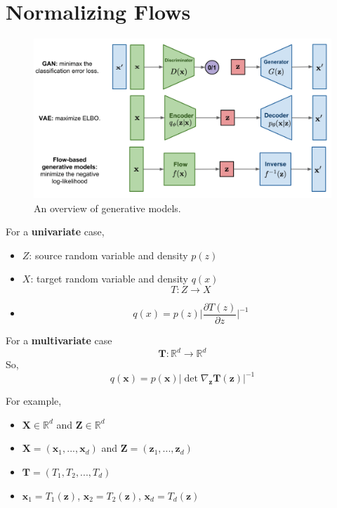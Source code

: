 \section{Normalizing Flows}

\begin{figure}[t]
	\centering
	\includegraphics[scale=0.13]{./images/generative/flows/generative_models.png}
	\caption{An overview of generative models.}
\end{figure}

For a \textbf{univariate} case, 
\begin{itemize}
    \item $Z$: source random variable and density $p(z)$
    \item $X$: target random variable and density $q(x)$
    $$T: Z\rightarrow X$$
    \item  
    $$q(x) = p(z)\Big|\frac{\partial T(z)}{\partial z}\Big|^{-1}$$
\end{itemize}

For a \textbf{multivariate} case
$$\mathbf{T}: \mathbb{R}^d \rightarrow \mathbb{R}^d$$
So, 
$$q(\mathbf{x})= p(\mathbf{x})|\det \nabla_{\mathbf{z}}\mathbf{T}(\mathbf{z})|^{-1}$$

For example,
\begin{itemize}
    \item  $\mathbf{X}\in \mathbb{R}^d$ and $\mathbf{Z}\in \mathbb{R}^d$
    \item  $\mathbf{X} = (\mathbf{x}_1, ..., \mathbf{x}_d)$ and $\mathbf{Z} = (\mathbf{z}_1, ..., \mathbf{z}_d)$
    \item $\mathbf{T} = (T_1, T_2,...,T_d)$
    \item $\mathbf{x}_1 = T_1(\mathbf{z})$, $\mathbf{x}_2 = T_2(\mathbf{z})$, $\mathbf{x}_d = T_d(\mathbf{z})$
\end{itemize}

